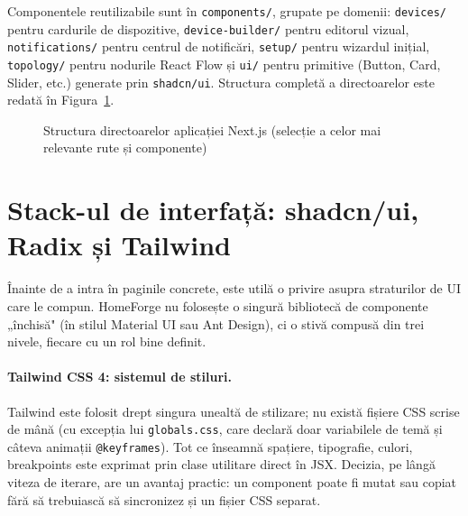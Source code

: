 Componentele reutilizabile sunt în \texttt{components/}, grupate pe domenii: \texttt{devices/} pentru cardurile de dispozitive, \texttt{device-builder/} pentru editorul vizual, \texttt{notifications/} pentru centrul de notificări, \texttt{setup/} pentru wizardul inițial, \texttt{topology/} pentru nodurile React Flow și \texttt{ui/} pentru primitive (Button, Card, Slider, etc.) generate prin \texttt{shadcn/ui}. Structura completă a directoarelor este redată în Figura~\ref{fig:frontend_tree}.

\begin{figure}[H]
    \centering
    \begin{minipage}{0.92\textwidth}
    \footnotesize
    \end{minipage}
    \caption{Structura directoarelor aplicației Next.js (selecție a celor mai relevante rute și componente)}
    \label{fig:frontend_tree}
\end{figure}

\section{Stack-ul de interfață: shadcn/ui, Radix și Tailwind}
Înainte de a intra în paginile concrete, este utilă o privire asupra straturilor de UI care le compun. HomeForge nu folosește o singură bibliotecă de componente „închisă" (în stilul Material UI sau Ant Design), ci o stivă compusă din trei nivele, fiecare cu un rol bine definit.

\paragraph{Tailwind CSS 4: sistemul de stiluri.} Tailwind este folosit drept singura unealtă de stilizare; nu există fișiere CSS scrise de mână (cu excepția lui \texttt{globals.css}, care declară doar variabilele de temă și câteva animații \texttt{@keyframes}). Tot ce înseamnă spațiere, tipografie, culori, breakpoints este exprimat prin clase utilitare direct în JSX. Decizia, pe lângă viteza de iterare, are un avantaj practic: un component poate fi mutat sau copiat fără să trebuiască să sincronizez și un fișier CSS separat.

